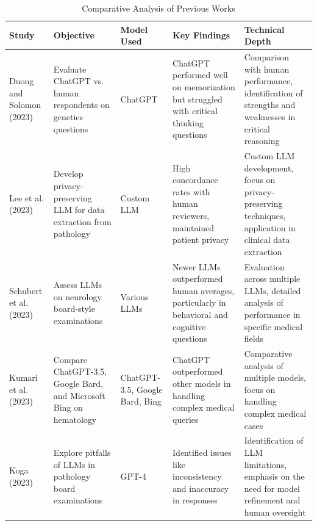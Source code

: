 \documentclass[onecolumn, conference]{IEEEtran}
\begin{document}
\begin{table}[ht]
  \centering
  \caption{Comparative Analysis of Previous Works}
  \begin{tabularx}{\textwidth}{|X|X|X|X|X|}
    \hline
    \textbf{Study}                                & \textbf{Objective}                                                  & \textbf{Model Used}            & \textbf{Key Findings}                                                                      & \textbf{Technical Depth}                                                                                            \\
    \hline
    Duong and Solomon (2023) \cite{Duong2023}     & Evaluate ChatGPT vs. human respondents on genetics questions        & ChatGPT                        & ChatGPT performed well on memorization but struggled with critical thinking questions      & Comparison with human performance, identification of strengths and weaknesses in critical reasoning                 \\
    \hline
    Lee et al. (2023) \cite{Lee2023}              & Develop privacy-preserving LLM for data extraction from pathology   & Custom LLM                     & High concordance rates with human reviewers, maintained patient privacy                    & Custom LLM development, focus on privacy-preserving techniques, application in clinical data extraction             \\
    \hline
    Schubert et al. (2023) \cite{Schubert2023}    & Assess LLMs on neurology board-style examinations                   & Various LLMs                   & Newer LLMs outperformed human averages, particularly in behavioral and cognitive questions & Evaluation across multiple LLMs, detailed analysis of performance in specific medical fields                        \\
    \hline
    Kumari et al. (2023) \cite{Kumari2023}        & Compare ChatGPT-3.5, Google Bard, and Microsoft Bing on hematology  & ChatGPT-3.5, Google Bard, Bing & ChatGPT outperformed other models in handling complex medical queries                      & Comparative analysis of multiple models, focus on handling complex medical cases                                    \\
    \hline
    Koga (2023) \cite{Koga2023}                   & Explore pitfalls of LLMs in pathology board examinations            & GPT-4                          & Identified issues like inconsistency and inaccuracy in responses                           & Identification of LLM limitations, emphasis on the need for model refinement and human oversight                    \\

\end{tabularx}
\end{table}
\end{document}
